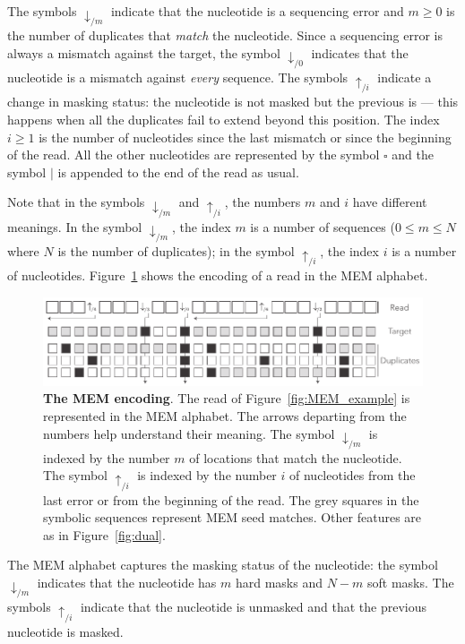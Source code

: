 \documentclass{article}
\begin{document}
The symbols $\downarrow_{/m}$ indicate that the nucleotide is a sequencing
error and $m \geq 0$ is the number of duplicates that \emph{match} the
nucleotide. Since a sequencing error is always a mismatch against the
target, the symbol $\downarrow_{/0}$ indicates that the nucleotide is a
mismatch against \emph{every} sequence. The symbols $\uparrow_{/i}$
indicate a change in masking status: the nucleotide is not masked but the
previous is --- this happens when all the duplicates fail to extend beyond
this position. The index $i \geq 1$ is the number of nucleotides since the
last mismatch or since the beginning of the read. All the other
nucleotides are represented by the symbol $\square$ and the symbol $|$ is
appended to the end of the read as usual.

Note that in the symbols $\downarrow_{/m}$ and $\uparrow_{/i}$, the
numbers $m$ and $i$ have different meanings. In the symbol
$\downarrow_{/m}$, the index $m$ is a number of sequences ($0 \leq m \leq
N$ where $N$ is the number of duplicates); in the symbol $\uparrow_{/i}$,
the index $i$ is a number of nucleotides. Figure~\ref{fig:sketch_extended}
shows the encoding of a read in the MEM alphabet.

\begin{figure}[h]
\centering
\includegraphics[scale=.84]{sketch_extended.pdf}
\caption{\textbf{The MEM encoding}.
The read of Figure~\ref{fig:MEM_example} is represented in the MEM alphabet.
The arrows departing from the numbers help understand their meaning. The
symbol $\downarrow_{/m}$ is indexed by the number $m$ of locations that
match the nucleotide. The symbol $\uparrow_{/i}$ is indexed by the number
$i$ of nucleotides from the last error or from the beginning of the read.
The grey squares in the symbolic sequences represent MEM seed matches.
Other features are as in Figure~\ref{fig:dual}.}
\label{fig:sketch_extended}
\end{figure}

The MEM alphabet captures the masking status of the nucleotide: the symbol
$\downarrow_{/m}$ indicates that the nucleotide has $m$ hard masks and
$N-m$ soft masks. The symbols $\uparrow_{/i}$ indicate that the nucleotide
is unmasked and that the previous nucleotide is masked.
\end{document}
